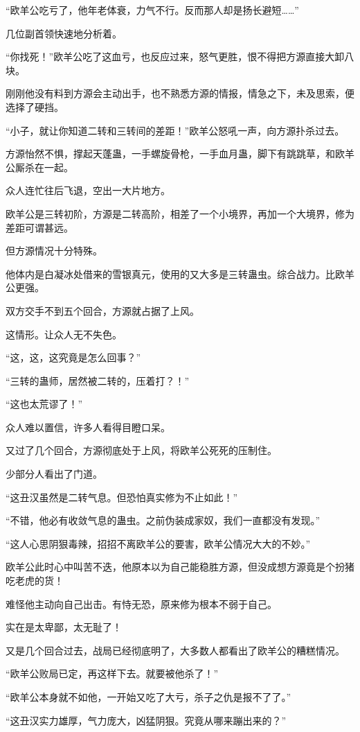\begin{this_body}
“欧羊公吃亏了，他年老体衰，力气不行。反而那人却是扬长避短……”

几位副首领快速地分析着。

“你找死！”欧羊公吃了这血亏，也反应过来，怒气更胜，恨不得把方源直接大卸八块。

刚刚他没有料到方源会主动出手，也不熟悉方源的情报，情急之下，未及思索，便选择了硬挡。

“小子，就让你知道二转和三转间的差距！”欧羊公怒吼一声，向方源扑杀过去。

方源怡然不惧，撑起天蓬蛊，一手螺旋骨枪，一手血月蛊，脚下有跳跳草，和欧羊公厮杀在一起。

众人连忙往后飞退，空出一大片地方。

欧羊公是三转初阶，方源是二转高阶，相差了一个小境界，再加一个大境界，修为差距可谓甚远。

但方源情况十分特殊。

他体内是白凝冰处借来的雪银真元，使用的又大多是三转蛊虫。综合战力。比欧羊公更强。

双方交手不到五个回合，方源就占据了上风。

这情形。让众人无不失色。

“这，这，这究竟是怎么回事？”

“三转的蛊师，居然被二转的，压着打？！”

“这也太荒谬了！”

众人难以置信，许多人看得目瞪口呆。

又过了几个回合，方源彻底处于上风，将欧羊公死死的压制住。

少部分人看出了门道。

“这丑汉虽然是二转气息。但恐怕真实修为不止如此！”

“不错，他必有收敛气息的蛊虫。之前伪装成家奴，我们一直都没有发现。”

“这人心思阴狠毒辣，招招不离欧羊公的要害，欧羊公情况大大的不妙。”

欧羊公此时心中叫苦不迭，他原本以为自己能稳胜方源，但没成想方源竟是个扮猪吃老虎的货！

难怪他主动向自己出击。有恃无恐，原来修为根本不弱于自己。

实在是太卑鄙，太无耻了！

又是几个回合过去，战局已经彻底明了，大多数人都看出了欧羊公的糟糕情况。

“欧羊公败局已定，再这样下去。就要被他杀了！”

“欧羊公本身就不如他，一开始又吃了大亏，杀子之仇是报不了了。”

“这丑汉实力雄厚，气力庞大，凶猛阴狠。究竟从哪来蹦出来的？”


\end{this_body}
